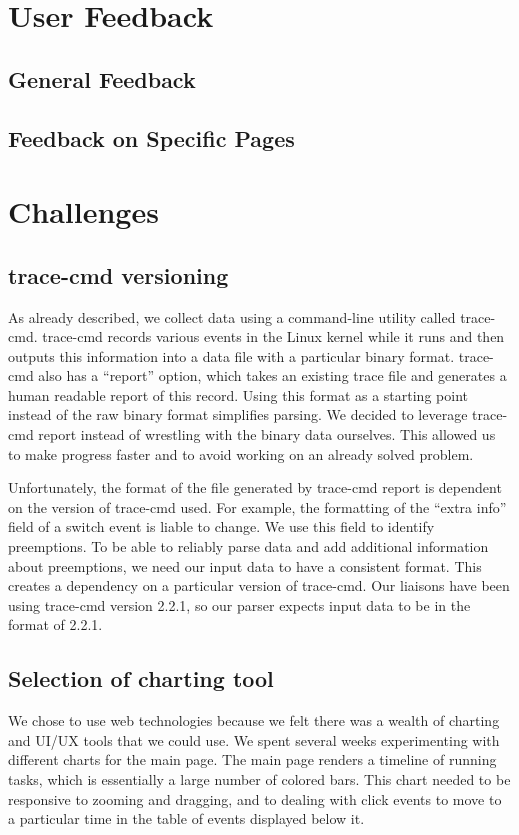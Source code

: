 \documentclass{hmcclinic}
\begin{document}
\chapter{User Feedback} %
\section{General Feedback} %
\section{Feedback on Specific Pages} %

\chapter{Challenges}
\section{trace-cmd versioning} %
  As already described, we collect data using a command-line utility called
  trace-cmd. trace-cmd records various events in the Linux kernel while it runs
  and then outputs this information into a data file with a particular binary
  format. trace-cmd also has a ``report'' option, which takes an existing trace
  file and generates a human readable report of this record. Using this format
  as a starting point instead of the raw binary format simplifies parsing.
  We decided to leverage trace-cmd report instead of wrestling with the binary
  data ourselves. This allowed us to make progress faster and to avoid working
  on an already solved problem.

  Unfortunately, the format of the file generated by trace-cmd report is
  dependent on the version of trace-cmd used. For example, the formatting of the
  ``extra info'' field of a switch event is liable to change. We use this
  field to identify preemptions. To be able to reliably parse data and add
  additional information about preemptions, we need our input data to have
  a consistent format. This creates a dependency on a particular version
  of trace-cmd. Our liaisons have been using trace-cmd version 2.2.1, so
  our parser expects input data to be in the format of 2.2.1.
\section{Selection of charting tool} %
  We chose to use web technologies because we felt there was a wealth of
  charting and UI/UX tools that we could use. We spent several weeks
  experimenting with different charts for the main page. The main page renders a
  timeline of running tasks, which is essentially a large number of colored
  bars. This chart needed to be responsive to zooming and dragging, and to
  dealing with click events to move to a particular time in the table of events
  displayed below it.
\end{document}

